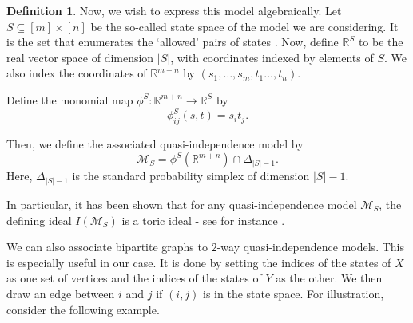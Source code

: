 \documentclass[11pt]{amsart}
\theoremstyle{definition}
\theoremstyle{definition}
\newtheorem{definition}[theorem]{Definition}
\theoremstyle{definition}
\theoremstyle{definition}
\begin{document}
\begin{definition}

Now, we wish to express this model algebraically.  Let $S\subseteq [m]\times[n]$ 
be the so-called state space of the model we are considering. It is the set that enumerates the ‘allowed’ pairs of states . Now, define $\mathbb{R}^S$ to be the real vector space of dimension $|S|$, with coordinates indexed by elements of $S$. We also index the coordinates of $\mathbb{R}^{m+n}$ by $(s_1,\ldots,s_m,t_1\ldots,t_n)$. 

\noindent
Define the monomial map $\phi^S:\mathbb{R}^{m+n} \rightarrow \mathbb{R}^S$ by
$$\phi^S_{ij}(s,t) = s_it_j.$$

\noindent
Then, we define the associated quasi-independence model by
$$\mathcal{M}_S = \phi^S(\mathbb{R}^{m+n}) \cap \Delta_{|S|-1}.$$
Here, $\Delta_{|S|-1}$ is the standard probability simplex of dimension $|S|-1$. 
\end{definition}

\noindent In particular, it has been shown that for any quasi-independence model $\mathcal{M}_S$, the defining ideal $I(\mathcal{M}_S)$ is a toric ideal - see for instance \cite[Chapter 6]{sullivant2023algebraic}. 

We can also associate bipartite graphs to $2$-way quasi-independence models. This is especially useful in our case. It is done by setting the indices of the states of $X$ as one set of vertices and the indices of the states of $Y$ as the other. We then draw an edge between $i$ and $j$ if $(i,j)$ is in the state space. For illustration, consider the following example.
\end{document}
